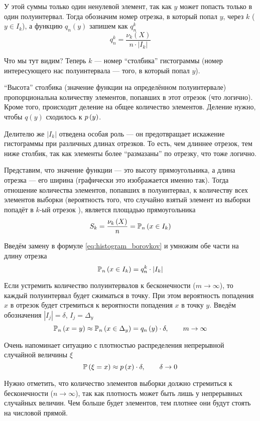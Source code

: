 У этой суммы только один ненулевой элемент,
так как $y$ может попасть только в один полуинтервал.
Тогда обозначим номер отрезка, в который попал $y$, через $k$ ($y\in I_k$),
а функцию $q_n\left(y\right)$ запишем как $q_n^k$
\begin{equation}\label{eq:histogram_borovkov}
q_n^k=
    \frac{\nu_k\left(X\right)}{n\cdot\left|I_k\right|}
\end{equation}


Что мы тут видим? Теперь $k$ --- номер ``столбика'' гистограммы
(номер интересующего нас полуинтервала --- того, в который попал $y$).

``Высота'' столбика (значение функции на определённом полуинтервале)
пропорциональна количеству элементов, попавших в этот отрезок (что логично).
Кроме того, происходит деление на общее количество элементов. Деление нужно,
чтобы $q\left(y\right)$ сходилось к $p\left(y\right)$.

Делителю же $\left|I_k\right|$ отведена особая роль --- он предотвращает
искажение гистограммы при различных длинах отрезков.
То есть, чем длиннее отрезок, тем ниже столбик,
так как элементы более ``размазаны'' по отрезку, что тоже логично.

Представим, что значение функции --- это высоту прямоугольника,
а длина отрезка --- его ширина (графически это изображается именно так).
Тогда отношение количества элементов, попавших в полуинтервал,
к количеству всех элементов выборки
(вероятность того,
что случайно взятый элемент из выборки
попадёт в $k$-ый отрезок \cite[стр.~24]{BorovkovMS}),
является площадью прямоугольника
$$S_k=\frac{\nu_k\left(X\right)}{n}=\mathbb{P}_n\left( x\in I_k \right)$$

Введём замену в формуле \eqref{eq:histogram_borovkov}
и умножим обе части на длину отрезка
$$\mathbb{P}_n\left( x\in I_k \right)=q_n^k\cdot\left|I_k\right|$$

Если устремить количество полуинтервалов к бесконечности ($m\to\infty$),
то каждый полуинтервал будет сжиматься в точку.
При этом вероятность попадения $x$ в отрезок будет стремиться
к вероятности попадения $x$ в точку $y$.
Введём обозначения $|I_j|=\delta$, $I_j=\Delta_y$
$$\mathbb{P}_n\left( x=y \right)
\approx\mathbb{P}_n\left( x\in\Delta_y \right)=q_n\left(y\right)\cdot\delta,
\qquad m\to\infty$$

Очень напоминает ситуацию с плотностью распределения
непрерывной случайной величины $\xi$
$$\mathbb{P}\left( \xi=x \right)\approx p\left(x\right)\cdot\delta,\qquad\delta\to 0$$

Нужно отметить,
что количество элементов выборки
должно стремиться к бесконечности ($n\to\infty$),
так как плотность может быть лишь у непрерывных случайных величин.
Чем больше будет элементов,
тем плотнее они будут стоять на числовой прямой.

